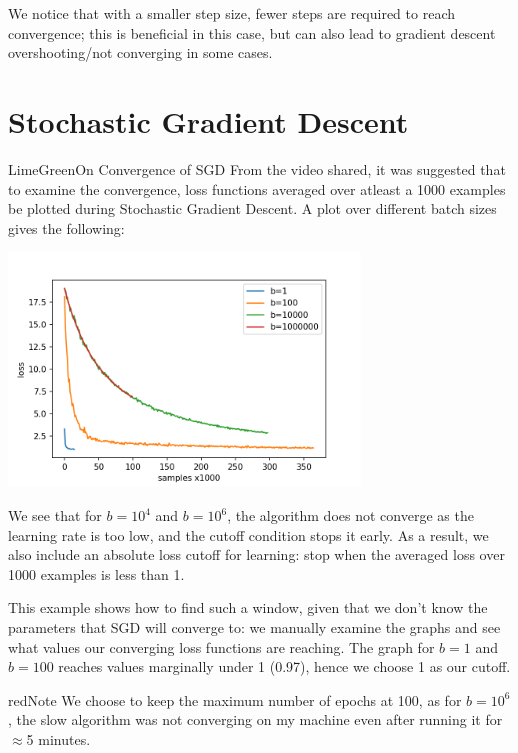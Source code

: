 \documentclass[12pt]{article}
\begin{document}
\begin{enumerate}[label=(\alph*)]
    We notice that with a smaller step size, fewer steps are required to reach convergence; this is beneficial in this case, but can also lead to gradient descent overshooting/not converging in some cases.

\end{enumerate}

\clearpage

\section*{Stochastic Gradient Descent}

\begin{mybox}{LimeGreen}{On Convergence of SGD}
From the video shared, it was suggested that to examine the convergence, loss functions averaged over atleast a 1000 examples be plotted during Stochastic Gradient Descent. A plot over different batch sizes gives the following:

\begin{center}
\includegraphics[width=0.7\textwidth]{../Q2/plots/loss.png}
\end{center}

We see that for $b=10^4$ and $b=10^6$, the algorithm does not converge as the learning rate is too low, and the cutoff condition stops it early. As a result, we also include an absolute loss cutoff for learning: stop when the averaged loss over 1000 examples is less than 1.

This example shows how to find such a window, given that we don't know the parameters that SGD will converge to: we manually examine the graphs and see what values our converging loss functions are reaching. The graph for $b=1$ and $b=100$ reaches values marginally under 1 (0.97), hence we choose 1 as our cutoff.
\end{mybox}

\begin{mybox}{red}{Note}
We choose to keep the maximum number of epochs at 100, as for $b=10^6$, the slow algorithm was not converging on my machine even after running it for $\approx$5 minutes.
\end{mybox}
\end{document}
